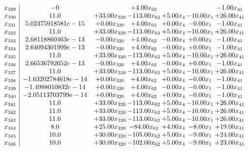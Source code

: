 \documentclass[8pt]{article}
\begin{document}
\[\begin{array}{c| c c@{\hskip 2pt} c@{\hskip 2pt} c@{\hskip 2pt} c@{\hskip 2pt} c@{\hskip 2pt} }
 x_{329}   &  -0  &   & +  4.00 x_{62} &    &   & -1.00 x_{41}\\
 x_{330}   &  11.0 & + 33.00 x_{320} & -113.00 x_{62} & +  5.00 x_{4} & -10.00 x_{1} & + 26.00 x_{41}\\
 x_{331}   &  5.02375918581e-15 & +  0.00 x_{320} & +  4.00 x_{62} & +  0.00 x_{4} & -0.00 x_{1} & -1.00 x_{41}\\
 x_{332}   &  11.0 & + 33.00 x_{320} & -113.00 x_{62} & +  5.00 x_{4} & -10.00 x_{1} & + 26.00 x_{41}\\
 x_{333}   &  2.68118860463e-13 & -0.00 x_{320} & +  4.00 x_{62} & -0.00 x_{4} & +  0.00 x_{1} & -1.00 x_{41}\\
 x_{334}   &  2.64094301999e-13 & -0.00 x_{320} & +  4.00 x_{62} & -0.00 x_{4} & +  0.00 x_{1} & -1.00 x_{41}\\
 x_{335}   &  11.0 & + 33.00 x_{320} & -113.00 x_{62} & +  5.00 x_{4} & -10.00 x_{1} & + 26.00 x_{41}\\
 x_{336}   &  2.66536792652e-13 & -0.00 x_{320} & +  4.00 x_{62} & -0.00 x_{4} & +  0.00 x_{1} & -1.00 x_{41}\\
 x_{337}   &  11.0 & + 33.00 x_{320} & -113.00 x_{62} & +  5.00 x_{4} & -10.00 x_{1} & + 26.00 x_{41}\\
 x_{338}   &  -1.63202784618e-14 & +  0.00 x_{320} & +  4.00 x_{62} & +  0.00 x_{4} & -0.00 x_{1} & -1.00 x_{41}\\
 x_{339}   &  -1.4988010832e-14 & +  0.00 x_{320} & +  4.00 x_{62} & -0.00 x_{4} & -0.00 x_{1} & -1.00 x_{41}\\
 x_{340}   &  -2.05113703799e-14 & +  0.00 x_{320} & +  4.00 x_{62} & +  0.00 x_{4} & -0.00 x_{1} & -1.00 x_{41}\\
 x_{341}   &  11.0 & + 33.00 x_{320} & -113.00 x_{62} & +  5.00 x_{4} & -10.00 x_{1} & + 26.00 x_{41}\\
 x_{342}   &  11.0 & + 33.00 x_{320} & -113.00 x_{62} & +  5.00 x_{4} & -10.00 x_{1} & + 26.00 x_{41}\\
 x_{343}   &  11.0 & + 33.00 x_{320} & -113.00 x_{62} & +  5.00 x_{4} & -10.00 x_{1} & + 26.00 x_{41}\\
 x_{344}   &  8.0 & + 25.00 x_{320} & -84.00 x_{62} & +  4.00 x_{4} & -8.00 x_{1} & + 19.00 x_{41}\\
 x_{345}   &  10.0 & + 30.00 x_{320} & -105.00 x_{62} & +  5.00 x_{4} & -9.00 x_{1} & + 24.00 x_{41}\\
 x_{346}   &  10.0 & + 30.00 x_{320} & -102.00 x_{62} & +  5.00 x_{4} & -9.00 x_{1} & + 23.00 x_{41}\\

\end{array}\]
\end{document}
